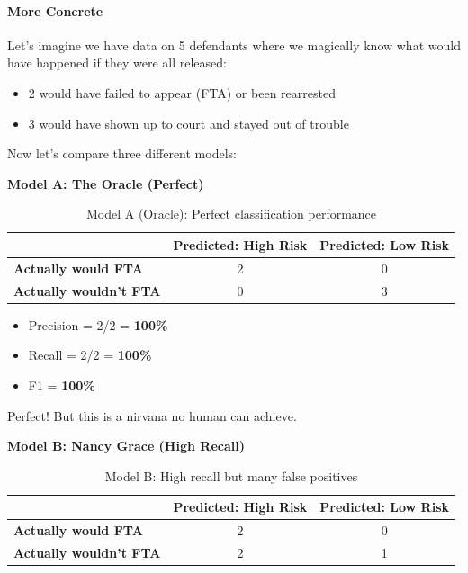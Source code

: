 \paragraph{More Concrete}

Let's imagine we have data on 5 defendants where we magically know what would have happened if they were all released:
\begin{itemize}
\item 2 would have failed to appear (FTA) or been rearrested
\item 3 would have shown up to court and stayed out of trouble
\end{itemize}

Now let's compare three different models:

\textbf{Model A: The Oracle (Perfect)}
\begin{table}[H]
\centering
\begin{tabular}{|l|c|c|}
\hline
& \textbf{Predicted: High Risk} & \textbf{Predicted: Low Risk} \\
\hline
\textbf{Actually would FTA} & 2 & 0 \\
\hline
\textbf{Actually wouldn't FTA} & 0 & 3 \\
\hline
\end{tabular}
\caption{Model A (Oracle): Perfect classification performance}
\label{tab:model-a-oracle}
\end{table}

\begin{itemize}
\item Precision = 2/2 = \textbf{100\%}
\item Recall = 2/2 = \textbf{100\%}
\item F1 = \textbf{100\%}
\end{itemize}

Perfect! But this is a nirvana no human can achieve.

\textbf{Model B: Nancy Grace (High Recall)}
\begin{table}[H]
\centering
\begin{tabular}{lcc}
\toprule
& \textbf{Predicted: High Risk} & \textbf{Predicted: Low Risk} \\
\midrule
\textbf{Actually would FTA} & 2 & 0 \\
\textbf{Actually wouldn't FTA} & 2 & 1 \\
\bottomrule
\end{tabular}
\caption{Model B: High recall but many false positives}
\label{tab:model-b-high-recall}
\end{table}

